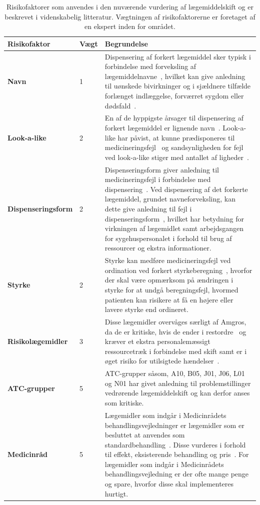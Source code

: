 \begin{longtable}{|p{3.5cm}|p{1.1cm}|p{9.2cm}|}
	\caption{Risikofaktorer som anvendes i den nuværende vurdering af lægemiddelskift og er beskrevet i videnskabelig litteratur. Vægtningen af risikofaktorerne er foretaget af en ekspert inden for området.} 
	\label{table:features} \\ \hline
\cellcolor[HTML]{C0C0C0} {\textbf{Risikofaktor}} & \cellcolor[HTML]{C0C0C0} {\textbf{Vægt}} & \cellcolor[HTML]{C0C0C0} {\textbf{Begrundelse}} \vspace{0.2cm} \\ \hline
\textbf{Navn} & 1 & Dispensering af forkert lægemiddel sker typisk i forbindelse med forveksling af lægemiddelnavne~\citep{DanskSelskabforPatientsikkerhed2009}, hvilket kan give anledning til uønskede bivirkninger og i sjældnere tilfælde forlænget indlæggelse, forværret sygdom eller dødsfald~\citep{DanskSelskabforPatientsikkerhed2009}.  \\  \hline 
\textbf{Look-a-like} & 2 & En af de hyppigste årsager til dispensering af forkert lægemiddel er lignende navn~\citep{Hakonsen2010}. Look-a-like har påvist, at kunne prædisponeres til medicineringsfejl~\citep{Wittich2014} og sandsynligheden for fejl ved look-a-like stiger med antallet af ligheder~\citep{Basco2010}. \\  \hline 
\textbf{Dispenseringsform} & 2 & Dispenseringsform giver anledning til medicineringsfejl i forbindelse med dispensering~\citep{Agrawal2009}. Ved dispensering af det forkerte lægemiddel, grundet navneforveksling, kan dette give anledning til fejl i dispenseringsform~\citep{DanskSelskabforPatientsikkerhed2009}, hvilket har betydning for virkningen af lægemidlet samt arbejdsgangen for sygehuspersonalet i forhold til brug af ressourcer og ekstra informationer.
\\ \hline 
\textbf{Styrke} & 2 & Styrke kan medføre medicineringsfejl ved ordination ved forkert styrkeberegning~\citep{Agrawal2009}, hvorfor der skal være opmærksom på ændringen i styrke for at undgå beregningsfejl, hvormed patienten kan risikere at få en højere eller lavere styrke end ordineret.\\ \hline
\textbf{Risikolægemidler} & 3 & Disse lægemidler overvåges særligt af Amgros, da de er kritiske, hvis de ender i restordre~\citep{Amgros} og kræver et ekstra personalemæssigt ressourcetræk i forbindelse med skift samt er i øget risiko for utilsigtede hændelser~\citep{Amgros}. \\ \hline 
\textbf{ATC-grupper} & 5 & ATC-grupper såsom, A10, B05, J01, J06, L01 og N01 har givet anledning til problemstillinger vedrørende lægemiddelskift og kan derfor anses som kritiske\citep{SRN}. \\ \hline 
\textbf{Medicinråd} & 5 & Lægemidler som indgår i Medicinrådets behandlingsvejledninger er lægemidler som er besluttet at anvendes som standardbehandling~\citep{Medicinradet2018}. Disse vurderes i forhold til effekt, eksisterende behandling og pris~\citep{Medicinradet2018}. For lægemidler som indgår i Medicinrådets behandlingsvejledning er der ofte mange penge og spare, hvorfor disse skal implementeres hurtigt. \\ \hline 
    \end{longtable}

